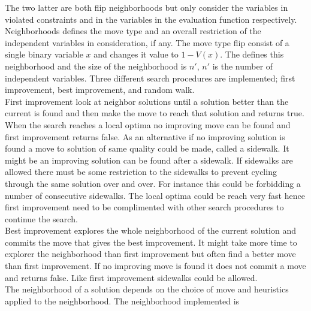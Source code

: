 The two latter are both flip neighborhoods but only consider the variables in violated 
constraints and in the variables in the evaluation function respectively. 
Neighborhoods defines the move type and an overall restriction of the independent variables in consideration, if any. 
The move type flip consist of a single binary variable $x$ and changes it value to $1-V(x)$. The 
 defines this neighborhood and the size of the neighborhood is $n'$, $n'$ is the number of 
independent variables.  
Three different search procedures are implemented; first improvement, best improvement, and random walk. \\ 
First improvement look at neighbor solutions until a solution better than the current is found  and then make the move to reach that solution and returns true. When the search reaches a local optima no 
improving move can be found and first improvement returns false. As an alternative if no 
improving solution is found a move to solution of same quality could be made, called a sidewalk. It might be an 
improving solution can be found after a sidewalk. If sidewalks are allowed there must be some restriction to the 
sidewalks to prevent cycling through the same solution over and over. For instance this could be forbidding a number of 
consecutive sidewalks. The local optima could be reach very fast hence first improvement need to be complimented with 
other search procedures to continue the search. \\ 
Best improvement explores the whole neighborhood of the current solution and commits the move that gives the best 
improvement. It might take more time to explorer the neighborhood than first improvement but often find a 
better move than first improvement. If no improving move is found it does not commit a move and returns false. Like 
first improvement sidewalks could be allowed. \\ 
The neighborhood of a solution depends on the choice of move and heuristics applied to the neighborhood. The 
neighborhood implemented is  
